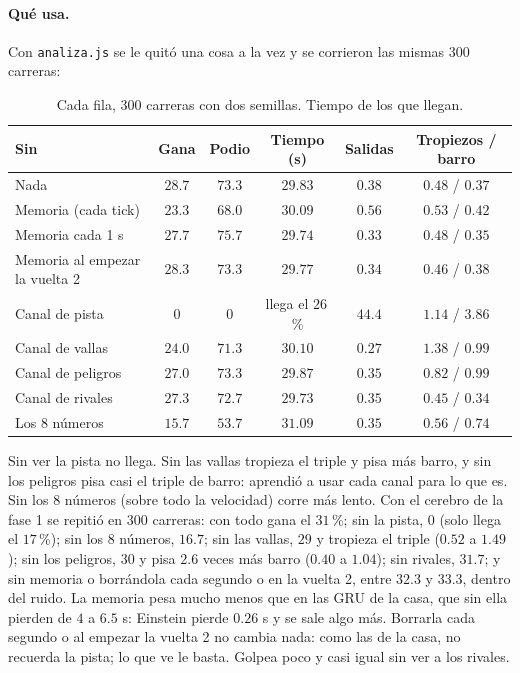 \documentclass[11pt,letterpaper]{article}
\begin{document}
\paragraph{Qué usa.} Con \texttt{analiza.js} se le quitó una cosa a la vez y se corrieron las mismas 300 carreras:
\begin{table}[h]\centering\footnotesize
\begin{tabular}{lccccc}
\toprule
Sin & Gana & Podio & Tiempo (s) & Salidas & Tropiezos / barro \\
\midrule
Nada & $28.7$ & $73.3$ & $29.83$ & $0.38$ & $0.48$ / $0.37$ \\
Memoria (cada tick) & $23.3$ & $68.0$ & $30.09$ & $0.56$ & $0.53$ / $0.42$ \\
Memoria cada 1 s & $27.7$ & $75.7$ & $29.74$ & $0.33$ & $0.48$ / $0.35$ \\
Memoria al empezar la vuelta 2 & $28.3$ & $73.3$ & $29.77$ & $0.34$ & $0.46$ / $0.38$ \\
Canal de pista & $0$ & $0$ & llega el $26$\,\% & $44.4$ & $1.14$ / $3.86$ \\
Canal de vallas & $24.0$ & $71.3$ & $30.10$ & $0.27$ & $1.38$ / $0.99$ \\
Canal de peligros & $27.0$ & $73.3$ & $29.87$ & $0.35$ & $0.82$ / $0.99$ \\
Canal de rivales & $27.3$ & $72.7$ & $29.73$ & $0.35$ & $0.45$ / $0.34$ \\
Los 8 números & $15.7$ & $53.7$ & $31.09$ & $0.35$ & $0.56$ / $0.74$ \\
\bottomrule
\end{tabular}
\caption{Cada fila, 300 carreras con dos semillas. Tiempo de los que llegan.}
\end{table}
Sin ver la pista no llega. Sin las vallas tropieza el triple y pisa más barro, y sin los peligros pisa casi el triple de barro: aprendió a usar cada canal para lo que es. Sin los 8 números (sobre todo la velocidad) corre más lento. Con el cerebro de la fase 1 se repitió en 300 carreras: con todo gana el $31$\,\%; sin la pista, $0$ (solo llega el $17$\,\%); sin los 8 números, $16.7$; sin las vallas, $29$ y tropieza el triple ($0.52$ a $1.49$); sin los peligros, $30$ y pisa $2.6$ veces más barro ($0.40$ a $1.04$); sin rivales, $31.7$; y sin memoria o borrándola cada segundo o en la vuelta 2, entre $32.3$ y $33.3$, dentro del ruido. La memoria pesa mucho menos que en las GRU de la casa, que sin ella pierden de $4$ a $6.5$ s: Einstein pierde $0.26$ s y se sale algo más. Borrarla cada segundo o al empezar la vuelta 2 no cambia nada: como las de la casa, no recuerda la pista; lo que ve le basta. Golpea poco y casi igual sin ver a los rivales.
\end{document}
